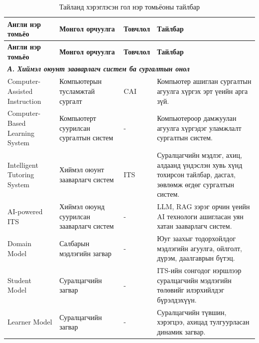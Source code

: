 
{\small
\renewcommand{\arraystretch}{1.2}
\begin{longtable}{p{} p{} p{} p{}}
\caption{Тайланд хэрэглэсэн гол нэр томьёоны тайлбар}\label{tab:glossary}\\
\toprule
\textbf{Англи нэр томьёо} & \textbf{Монгол орчуулга} & \textbf{Товчлол} & \textbf{Тайлбар} \\
\midrule
\endfirsthead
\toprule
\textbf{Англи нэр томьёо} & \textbf{Монгол орчуулга} & \textbf{Товчлол} & \textbf{Тайлбар} \\
\midrule
\endhead

\multicolumn{4}{l}{\textbf{\textit{А. Хиймэл оюунт зааварлагч систем ба сургалтын онол}}} \\
\midrule

Computer-Assisted Instruction & Компьютерын тусламжтай сургалт & CAI & Компьютер ашиглан сургалтын агуулга хүргэх эрт үеийн арга зүй. \\

Computer-Based Learning System & Компьютерт суурилсан сургалтын систем & - & Компьютероор дамжуулан агуулга хүргэдэг уламжлалт сургалтын систем. \\

Intelligent Tutoring System & Хиймэл оюунт зааварлагч систем & ITS & Суралцагчийн мэдлэг, ахиц, алдаанд үндэслэн хувь хүнд тохирсон тайлбар, дасгал, зөвлөмж өгдөг сургалтын систем. \\

AI-powered ITS & Хиймэл оюунд суурилсан зааварлагч систем & - & LLM, RAG зэрэг орчин үеийн AI технологи ашигласан уян хатан зааварлагч систем. \\

Domain Model & Салбарын мэдлэгийн загвар & - & Юуг заахыг тодорхойлдог мэдлэгийн агуулга, ойлголт, дүрэм, даалгаврын бүтэц. \\

Student Model & Суралцагчийн загвар & - & ITS-ийн сонгодог нэршлээр суралцагчийн мэдлэгийн төлөвийг илэрхийлдэг бүрэлдэхүүн. \\

Learner Model & Суралцагчийн загвар & - & Суралцагчийн түвшин, хэрэгцээ, ахицад тулгуурласан динамик загвар. \\


\end{longtable}}
